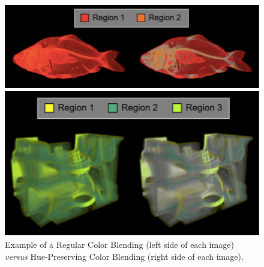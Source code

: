 \documentclass{report}
\begin{document}
%
\begin{figure}[!h]
  \centering%
  \begin{minipage}{0.3\textwidth}
    \includegraphics[width=\linewidth]{HuePreserving_3.png}
  \end{minipage}%
  \hspace{0.2\textwidth}%
  \begin{minipage}{0.3\textwidth}\centering
    \includegraphics[width=\linewidth]{HuePreserving_4.png}
  \end{minipage}%
  \caption[Hue-Preserving Color Blending Examples]{Example of a Regular Color Blending (left side of each image) \emph{versus}
    Hue-Preserving Color Blending (right side of each image). \protect\cite{Chuang2009}}
  \label{fig:examples}
\end{figure}
%
\end{document}
